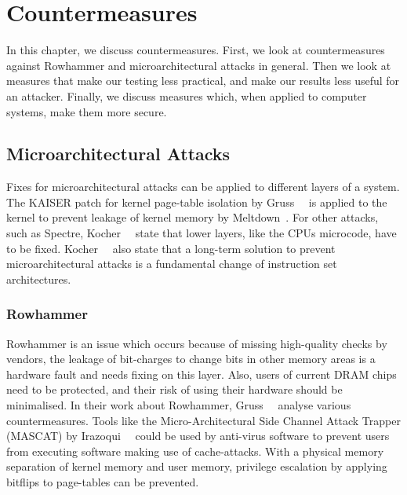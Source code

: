 \chapter{Countermeasures}\label{sec:countermeasure}

In this chapter, we discuss countermeasures. First, we look at countermeasures
against Rowhammer and microarchitectural attacks in general. Then we look at
measures that make our testing less practical, and make our results less useful
for an attacker. Finally, we discuss measures which, when applied to computer
systems, make them more secure.

\section{Microarchitectural Attacks}

Fixes for microarchitectural attacks can be applied to different layers of a
system. The KAISER patch for kernel page-table isolation by
Gruss~\etal~\cite{kaiserpaper} is applied to the kernel to prevent leakage of
kernel memory by Meltdown~\cite{meltdown}. For other attacks, such as Spectre,
Kocher~\etal~\cite{spectre} state that lower layers, like the
CPU\textquotesingle s microcode, have to be fixed. Kocher~\etal~\cite{spectre}
also state that a long-term solution to prevent microarchitectural attacks is a
fundamental change of instruction set architectures.

\subsection{Rowhammer}

Rowhammer is an issue which occurs because of missing high-quality checks by
vendors, the leakage of bit-charges to change bits in other memory areas is a
hardware fault and needs fixing on this layer. Also, users of current DRAM
chips need to be protected, and their risk of using their hardware should be
minimalised. In their work about Rowhammer, Gruss~\etal~\cite{flipinthewall}
analyse various countermeasures. Tools like the Micro-Architectural Side
Channel Attack Trapper (MASCAT) by Irazoqui~\etal~\cite{mascat} could be used by
anti-virus software to prevent users from executing software making use of
cache-attacks. With a physical memory separation of kernel memory and user
memory, privilege escalation by applying bitflips to page-tables can be
prevented.

